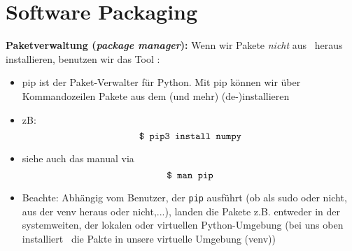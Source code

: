 \section{Software Packaging}

\textbf{Paketverwaltung (\textit{package manager}):}  Wenn wir Pakete \textit{nicht} aus \pycharm~heraus installieren, benutzen wir das Tool :
\begin{itemize}
	\item pip ist der Paket-Verwalter für Python. Mit pip können wir über Kommandozeilen Pakete aus dem  (und mehr) (de-)installieren
	\item zB: $$\texttt{\$ pip3 install numpy}$$
	\item siehe auch das manual via $$\texttt{\$ man pip}$$
	\item Beachte: Abhängig vom Benutzer, der \texttt{pip} ausführt (ob als sudo oder nicht, aus der venv heraus oder nicht,...), landen die Pakete z.B. entweder in der systemweiten, der lokalen oder virtuellen Python-Umgebung (bei uns oben installiert \pycharm~die Pakte in unsere virtuelle Umgebung (venv))
\end{itemize}
